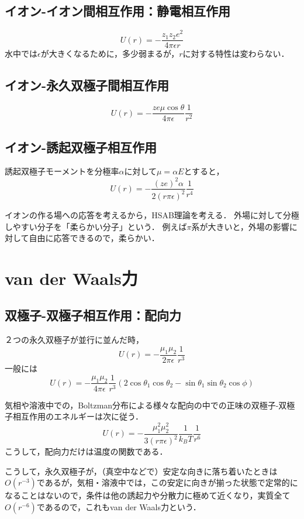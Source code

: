 \documentclass[uplatex, dvipdfmx]{jsreport}
\begin{document}
\subsection{イオン-イオン間相互作用：静電相互作用}

\[U(r)=-\frac{z_1z_2e^2}{4\pi\epsilon r}\]
水中では$\epsilon$が大きくなるために，多少弱まるが，$r$に対する特性は変わらない．

\subsection{イオン-永久双極子間相互作用}

\[ U(r)=-\frac{ze\mu\cos\theta}{4\pi\epsilon}\frac{1}{r^2} \]

\subsection{イオン-誘起双極子相互作用}

誘起双極子モーメントを分極率$\alpha$に対して$\mu=\alpha E$とすると，
\[ U(r) = -\frac{(ze)^2\alpha}{2(r\pi\epsilon)^2}\frac{1}{r^4} \]

イオンの作る場への応答を考えるから，HSAB理論を考える．
外場に対して分極しやすい分子を「柔らかい分子」という．
例えば$\pi$系が大きいと，外場の影響に対して自由に応答できるので，柔らかい．

\section{van der Waals力}

\subsection{双極子-双極子相互作用：配向力}

２つの永久双極子が並行に並んだ時，
\[ U(r)=-\frac{\mu_1\mu_2}{2\pi\epsilon}\frac{1}{r^3} \]
一般には
\[U(r)=-\frac{\mu_1\mu_2}{4\pi\epsilon}\frac{1}{r^3}(2\cos\theta_1\cos\theta_2-\sin\theta_1\sin\theta_2\cos\phi)\]

気相や溶液中での，Boltzman分布による様々な配向の中での正味の双極子-双極子相互作用のエネルギーは次に従う．
\[ U(r) = -\frac{\mu_1^2\mu_2^2}{3(r\pi\epsilon)^2}\frac{1}{k_BT}\frac{1}{r^6} \]
こうして，配向力だけは温度の関数である．

こうして，永久双極子が，（真空中などで）安定な向きに落ち着いたときは$O(r^{-3})$であるが，気相・溶液中では，この安定に向きが揃った状態で定常的になることはないので，条件は他の誘起力や分散力に極めて近くなり，実質全て$O(r^{-6})$であるので，これもvan der Waals力という．
\end{document}

